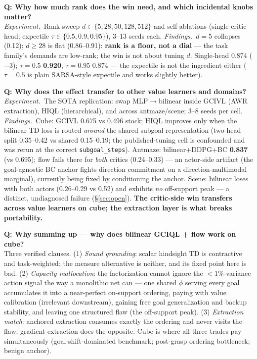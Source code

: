 \documentclass[11pt]{article}
\newcommand{\numgood}[1]{\textbf{\textcolor{green!45!black}{#1}}}
\newcommand{\whyq}[1]{\medskip\noindent\textbf{\textcolor{blue!50!black}{Q: Why #1}}\\}
\newcommand{\exppar}{\noindent\emph{Experiment.}\ }
\newcommand{\findpar}{\noindent\emph{Findings.}\ }
\begin{document}
\whyq{how much rank does the win need, and which incidental knobs matter?}
\exppar Rank sweep $d\in\{5,28,50,128,512\}$ and self-ablations (single critic head;
expectile $\tau\in\{0.5,0.9,0.95\}$), 3--13 seeds each.
\findpar $d{=}5$ collapses (0.12); $d\ge 28$ is flat (0.86--0.91): \textbf{rank is a floor,
not a dial} --- the task family's demands are low-rank; the win is not about tuning $d$.
Single-head 0.874 ($-3$); $\tau{=}0.5$ \numgood{0.920}, $\tau{=}0.95$ 0.874 --- the expectile
is not the ingredient either ($\tau{=}0.5$ is plain SARSA-style expectile and works
slightly better).

\whyq{does the effect transfer to other value learners and domains?}
\exppar The SOTA replication: swap MLP$\to$bilinear inside GCIVL (AWR extraction), HIQL
(hierarchical), and across antmaze/scene; 3--8 seeds per cell.
\findpar Cube: GCIVL 0.675 vs 0.496 stock; HIQL improves only when the bilinear TD loss is
routed \emph{around} the shared subgoal representation (two-head split 0.35--0.42 vs shared
0.15--0.19; the published-tuning cell is confounded and was rerun at the correct
\texttt{subgoal\_steps}). Antmaze: bilinear+DDPG+BC \numgood{0.837} (vs 0.695); flow fails
there for \emph{both} critics (0.24--0.33) --- an actor-side artifact (the goal-agnostic BC
anchor fights direction commitment on a direction-multimodal marginal), currently being
fixed by conditioning the anchor. Scene: bilinear loses with both actors (0.26--0.29 vs
0.52) and exhibits \emph{no} off-support peak --- a distinct, undiagnosed failure
(\S\ref{sec:open}). \textbf{The critic-side win transfers across value learners on cube;
the extraction layer is what breaks portability.}

\whyq{summing up --- why does bilinear GCIQL + flow work on cube?}
Three verified clauses. (1) \emph{Sound grounding}: scalar hindsight TD is contractive and
task-weighted; the measure alternative is neither, and its fixed point here is bad.
(2) \emph{Capacity reallocation}: the factorization cannot ignore the $<1\%$-variance action
signal the way a monolithic net can --- one shared $\phi$ serving every goal accumulates it
into a near-perfect on-support ordering, paying with value calibration (irrelevant
downstream), gaining free goal generalization and backup stability, and leaving one
structured flaw (the off-support peak). (3) \emph{Extraction match}: anchored extraction
consumes exactly the ordering and never visits the flaw; gradient extraction does the
opposite. Cube is where all three trades pay simultaneously (goal-shift-dominated
benchmark; post-grasp ordering bottleneck; benign anchor).
\end{document}

